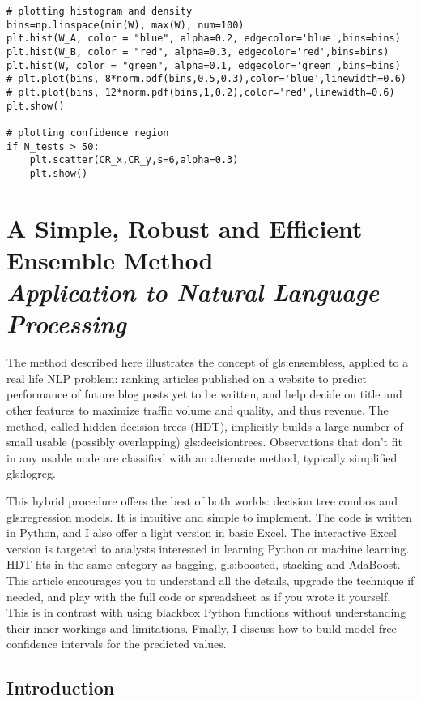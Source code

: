 \documentclass[oneside,10pt]{book}
\newcommand\Chapter[2]{
  \chapter[#1]{#1\\[2ex]\Large\itshape#2}
}
\begin{document}
\begin{lstlisting}[escapechar=@]
# plotting histogram and density
bins=np.linspace(min(W), max(W), num=100)
plt.hist(W_A, color = "blue", alpha=0.2, edgecolor='blue',bins=bins)
plt.hist(W_B, color = "red", alpha=0.3, edgecolor='red',bins=bins)
plt.hist(W, color = "green", alpha=0.1, edgecolor='green',bins=bins)
# plt.plot(bins, 8*norm.pdf(bins,0.5,0.3),color='blue',linewidth=0.6)
# plt.plot(bins, 12*norm.pdf(bins,1,0.2),color='red',linewidth=0.6)
plt.show()

# plotting confidence region
if N_tests > 50:
    plt.scatter(CR_x,CR_y,s=6,alpha=0.3)
    plt.show()
\end{lstlisting}

\Chapter{A Simple, Robust and Efficient Ensemble Method}{Application to Natural Language Processing}

The method described here illustrates the concept of \glspl{gls:ensembles}, applied to a real life NLP problem: ranking articles published on a website to
predict performance of future blog posts yet to be written, and help decide on title and other features to maximize traffic volume and quality, and thus revenue.
The method, called hidden decision trees (HDT), implicitly builds a large number of small usable (possibly overlapping) \glspl{gls:decisiontree}. Observations that
don't fit in any usable node are classified with an alternate method, typically simplified \gls{gls:logreg}.

This hybrid procedure offers the best of both worlds: decision tree combos  and \gls{gls:regression} models.  It is intuitive and simple to implement. The code is written in Python, and I also offer a light version in basic Excel. The interactive Excel version is targeted to analysts interested in learning Python or machine learning. HDT fits in the same category as bagging, \gls{gls:boosted}, stacking and \textcolor{index}{AdaBoost}.  This article encourages you to understand all the details, upgrade the technique if needed, and play with the full code or spreadsheet as if you wrote it yourself. This is in contrast with using blackbox Python functions without understanding their inner workings and limitations. Finally, I discuss how to build model-free confidence intervals for the predicted values.

 \section{Introduction}
\end{document}
